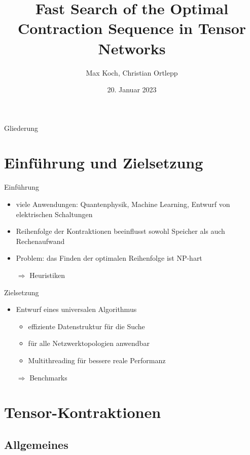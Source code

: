 \documentclass{beamer}
\title{Fast Search of the Optimal Contraction Sequence in Tensor Networks \cite{9325533}}
\author{Max Koch, Christian Ortlepp}
\institute{Friedrich-Schiller-Universität Jena}
\date{20. Januar 2023}
\begin{document}
\begin{frame}
	\titlepage
\end{frame}

\begin{frame}[allowframebreaks=0.8]{Gliederung}
	\tableofcontents
\end{frame}

\section{Einführung und Zielsetzung}
\begin{frame}{Einführung}
	\begin{itemize}
		\item viele Anwendungen: Quantenphysik, Machine Learning, Entwurf von elektrischen Schaltungen
		\item Reihenfolge der Kontraktionen beeinflusst sowohl Speicher als auch Rechenaufwand
		\item Problem: das Finden der optimalen Reihenfolge ist NP-hart
		\item[$\Rightarrow$] Heuristiken
	\end{itemize}
\end{frame}

\begin{frame}{Zielsetzung}
	\begin{itemize}
		\item Entwurf eines universalen Algorithmus \begin{itemize}
			      \item effiziente Datenstruktur für die Suche
			      \item für alle Netzwerktopologien anwendbar
			      \item Multithreading für bessere reale Performanz
		      \end{itemize}
		\item[$\Rightarrow$] Benchmarks
	\end{itemize}
\end{frame}

\section{Tensor-Kontraktionen}
\subsection{Allgemeines}
\end{document}
